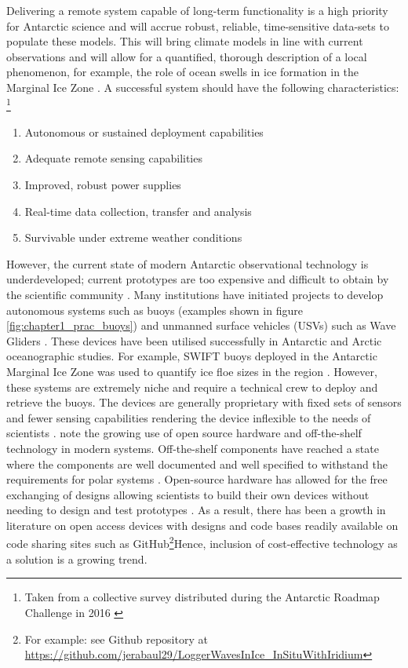 Delivering a remote system capable of long-term functionality is a high priority for Antarctic science \cite{kennicutt2016delivering} and will accrue robust, reliable, time-sensitive data-sets to populate these models. This will bring climate models in line with current observations and will allow for a quantified, thorough description of a local phenomenon, for example, the role of ocean swells in ice formation in the Marginal Ice Zone \cite{doble2013wave}. A successful system should have the following characteristics: \footnote{Taken from a collective survey distributed during the Antarctic Roadmap Challenge in 2016 \cite{kennicutt2016delivering}} 
\begin{enumerate}

    \item Autonomous or sustained deployment capabilities
    \item Adequate remote sensing capabilities
    \item Improved, robust power supplies
    \item Real-time data collection, transfer and analysis
    \item Survivable under extreme weather conditions
\end{enumerate}

However, the current state of  modern Antarctic observational technology is underdeveloped; current prototypes are too expensive and difficult to obtain by the scientific community \cite{kennicutt2016delivering}. Many institutions have initiated projects to develop autonomous systems such as buoys (examples shown in figure \ref{fig:chapter1_prac_buoys}) and unmanned surface vehicles (USVs) such as Wave Gliders \cite{liquidrobot2016wave,swart2020submesoscale}. These devices have been utilised successfully in Antarctic and Arctic oceanographic studies. For example, SWIFT buoys deployed in the Antarctic Marginal Ice Zone was used to quantify ice floe sizes in the region \cite{alberello2019brief}. However, these systems are extremely niche and require a technical crew to deploy and retrieve the buoys. The devices are generally proprietary with fixed sets of sensors and fewer sensing capabilities rendering the device inflexible to the needs of scientists \cite{rabault2017measurements}. \textcite{rabault2019open} note the growing use of open source hardware and off-the-shelf technology in modern systems. Off-the-shelf  components have reached a state where the components are well documented and well specified to withstand the requirements for polar systems \cite{rabault2019open}. Open-source hardware has allowed for the free exchanging of designs allowing scientists to build their own devices without needing to design and test prototypes \cite{rabault2019open}. As a result, there has been a growth in literature on open access devices with designs and code bases readily available on code sharing sites such as GitHub\footnote{For example: see \textcite{rabault2019open} Github repository at \url{https://github.com/jerabaul29/LoggerWavesInIce_InSituWithIridium}}Hence, inclusion of cost-effective technology as a solution is a growing trend. \par 

